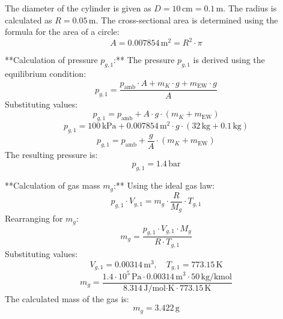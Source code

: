 The diameter of the cylinder is given as \( D = 10 \, \text{cm} = 0.1 \, \text{m} \).  
The radius is calculated as \( R = 0.05 \, \text{m} \).  
The cross-sectional area is determined using the formula for the area of a circle:  
\[
A = 0.007854 \, \text{m}^2 = R^2 \cdot \pi
\]

**Calculation of pressure \( p_{g,1} \):**  
The pressure \( p_{g,1} \) is derived using the equilibrium condition:  
\[
p_{g,1} = \frac{p_{\text{amb}} \cdot A + m_K \cdot g + m_{\text{EW}} \cdot g}{A}
\]  
Substituting values:  
\[
p_{g,1} = p_{\text{amb}} + A \cdot g \cdot (m_K + m_{\text{EW}})
\]  
\[
p_{g,1} = 100 \, \text{kPa} + 0.007854 \, \text{m}^2 \cdot g \cdot (32 \, \text{kg} + 0.1 \, \text{kg})
\]  
\[
p_{g,1} = p_{\text{amb}} + \frac{g}{A} \cdot (m_K + m_{\text{EW}})
\]  
The resulting pressure is:  
\[
p_{g,1} = 1.4 \, \text{bar}
\]

**Calculation of gas mass \( m_g \):**  
Using the ideal gas law:  
\[
p_{g,1} \cdot V_{g,1} = m_g \cdot \frac{R}{M_g} \cdot T_{g,1}
\]  
Rearranging for \( m_g \):  
\[
m_g = \frac{p_{g,1} \cdot V_{g,1} \cdot M_g}{R \cdot T_{g,1}}
\]  
Substituting values:  
\[
V_{g,1} = 0.00314 \, \text{m}^3, \quad T_{g,1} = 773.15 \, \text{K}
\]  
\[
m_g = \frac{1.4 \cdot 10^5 \, \text{Pa} \cdot 0.00314 \, \text{m}^3 \cdot 50 \, \text{kg/kmol}}{8.314 \, \text{J/mol·K} \cdot 773.15 \, \text{K}}
\]  
The calculated mass of the gas is:  
\[
m_g = 3.422 \, \text{g}
\]